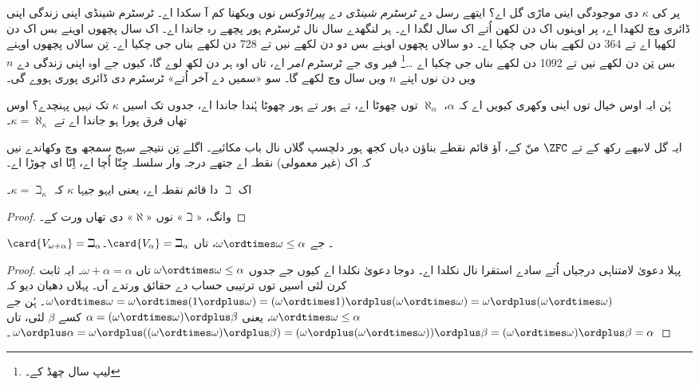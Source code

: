 \documentclass[../../../include/open-logic-section]{subfiles}
\begin{document}
پر کی $\kappa$ دی موجودگی اینی ماڑی گل اے؟ ایتھے رسل دے \emph{ٹرسٹرم شینڈی دے پیراڈوکس} نوں ویکھنا کم آ سکدا اے۔ ٹرسٹرم شینڈی اپنی زندگی اپنی ڈائری وچ لکھدا اے، پر اوہنوں اک دن لکھن اُتے اک سال لگدا اے۔ ہر لنگھدے سال نال ٹرسٹرم ہور پچھے رہ جاندا اے۔ اک سال پچھوں اوہنے بس اک دن لکھیا اے تے 364 دن لکھے بناں جی چکیا اے۔ دو سالاں پچھوں اوہنے بس دو دن لکھے نیں تے 728 دن لکھے بناں جی چکیا اے۔ تِن سالاں پچھوں اوہنے بس تِن دن لکھے نیں تے 1092 دن لکھے بناں جی چکیا اے \dots\footnote{لیپ سال چھڈ کے۔} فیر وی جے ٹرسٹرم \emph{امر} اے، تاں اوہ ہر دن لکھ لوے گا، کیوں جے اوہ اپنی زندگی دے $n$ ویں دن نوں اپنے $n$ ویں سال وچ لکھے گا۔ سو «سمیں دے آخر اُتے» ٹرسٹرم دی ڈائری پوری ہووے گی۔

ہُن ایہ اوس خیال توں اینی وکھری کیویں اے کہ $\alpha$، $\aleph_\alpha$ توں چھوٹا اے، تے ہور تے ہور چھوٹا ہُندا جاندا اے، جدوں تک اسیں $\kappa$ تک نہیں پہنچدے؟ اوس تھاں فرق پورا ہو جاندا اے تے $\kappa
= \aleph_\kappa$۔

ایہ گل لاںبھے رکھ کے تے $\ZFC$ منّ کے، آؤ قائم نقطے بناؤن دیاں کجھ ہور دلچسپ گلاں نال باب مکائیے۔ اگلے تِن نتیجے سہج سمجھ وچ وکھاندے نیں کہ اک (غیر معمولی) نقطہ اے جتھے درجہ وار سلسلہ جِنّا اُچا اے، اِنّا ای چوڑا اے۔

\begin{prop}
اک $\beth$ دا قائم نقطہ اے، یعنی ایہو جیہا $\kappa$ کہ $\kappa=
\beth_\kappa$۔
\end{prop}

\begin{proof}
 وانگ، «$\beth$» نوں «$\aleph$» دی تھاں ورت کے۔
\end{proof}

\begin{prop}
$\card{V_{\omega+\alpha}} = \beth_{\alpha}$۔ جے $\omega \ordtimes
\omega \leq \alpha$، تاں $\card{V_\alpha} = \beth_\alpha$۔
\end{prop}

\begin{proof}
پہلا دعویٰ لامتناہی درجیاں اُتے سادے استقرا نال نکلدا اے۔ دوجا دعویٰ نکلدا اے کیوں جے جدوں $\omega \ordtimes \omega \leq \alpha$ تاں
$\omega + \alpha = \alpha$۔ ایہ ثابت کرن لئی اسیں  توں ترتیبی حساب دے حقائق ورتدے آں۔ پہلاں دھیان دیو کہ $\omega \ordtimes \omega = \omega \ordtimes (1 \ordplus \omega) =
(\omega  \ordtimes 1) \ordplus (\omega\ordtimes\omega) = \omega
\ordplus (\omega \ordtimes \omega)$۔ ہُن جے $\omega \ordtimes \omega
\leq \alpha$، یعنی $\alpha = (\omega\ordtimes\omega) \ordplus \beta$
کسے $\beta$ لئی، تاں $\omega \ordplus \alpha = \omega \ordplus
((\omega \ordtimes \omega) \ordplus \beta) = (\omega \ordplus (\omega
\ordtimes \omega)) \ordplus \beta = (\omega \ordtimes \omega) \ordplus
\beta = \alpha$۔
\end{proof}
\end{document}
